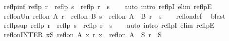 \begin{isabellebody}
%
\endisadelimproof
\isanewline
{}\isamarkupfalse%
\ reflp{\isacharunderscore}{\kern0pt}inf{\isacharcolon}{\kern0pt}\ {\isachardoublequoteopen}reflp\ r\ {\isasymLongrightarrow}\ reflp\ s\ {\isasymLongrightarrow}\ reflp\ {\isacharparenleft}{\kern0pt}r\ {\isasymsqinter}\ s{\isacharparenright}{\kern0pt}{\isachardoublequoteclose}\isanewline
%
\isadelimproof
\ \ %
\endisadelimproof
%
\isatagproof
{}\isamarkupfalse%
\ {\isacharparenleft}{\kern0pt}auto\ intro{\isacharcolon}{\kern0pt}\ reflpI\ elim{\isacharcolon}{\kern0pt}\ reflpE{\isacharparenright}{\kern0pt}%
\endisatagproof
{\isafoldproof}%
%
\isadelimproof
\isanewline
%
\endisadelimproof
\isanewline
{}\isamarkupfalse%
\ refl{\isacharunderscore}{\kern0pt}on{\isacharunderscore}{\kern0pt}Un{\isacharcolon}{\kern0pt}\ {\isachardoublequoteopen}refl{\isacharunderscore}{\kern0pt}on\ A\ r\ {\isasymLongrightarrow}\ refl{\isacharunderscore}{\kern0pt}on\ B\ s\ {\isasymLongrightarrow}\ refl{\isacharunderscore}{\kern0pt}on\ {\isacharparenleft}{\kern0pt}A\ {\isasymunion}\ B{\isacharparenright}{\kern0pt}\ {\isacharparenleft}{\kern0pt}r\ {\isasymunion}\ s{\isacharparenright}{\kern0pt}{\isachardoublequoteclose}\isanewline
%
\isadelimproof
\ \ %
\endisadelimproof
%
\isatagproof
{}\isamarkupfalse%
\ refl{\isacharunderscore}{\kern0pt}on{\isacharunderscore}{\kern0pt}def\ \isamarkupfalse%
\ blast%
\endisatagproof
{\isafoldproof}%
%
\isadelimproof
\isanewline
%
\endisadelimproof
\isanewline
{}\isamarkupfalse%
\ reflp{\isacharunderscore}{\kern0pt}sup{\isacharcolon}{\kern0pt}\ {\isachardoublequoteopen}reflp\ r\ {\isasymLongrightarrow}\ reflp\ s\ {\isasymLongrightarrow}\ reflp\ {\isacharparenleft}{\kern0pt}r\ {\isasymsqunion}\ s{\isacharparenright}{\kern0pt}{\isachardoublequoteclose}\isanewline
%
\isadelimproof
\ \ %
\endisadelimproof
%
\isatagproof
{}\isamarkupfalse%
\ {\isacharparenleft}{\kern0pt}auto\ intro{\isacharcolon}{\kern0pt}\ reflpI\ elim{\isacharcolon}{\kern0pt}\ reflpE{\isacharparenright}{\kern0pt}%
\endisatagproof
{\isafoldproof}%
%
\isadelimproof
\isanewline
%
\endisadelimproof
\isanewline
{}\isamarkupfalse%
\ refl{\isacharunderscore}{\kern0pt}on{\isacharunderscore}{\kern0pt}INTER{\isacharcolon}{\kern0pt}\ {\isachardoublequoteopen}{\isasymforall}x{\isasymin}S{\isachardot}{\kern0pt}\ refl{\isacharunderscore}{\kern0pt}on\ {\isacharparenleft}{\kern0pt}A\ x{\isacharparenright}{\kern0pt}\ {\isacharparenleft}{\kern0pt}r\ x{\isacharparenright}{\kern0pt}\ {\isasymLongrightarrow}\ refl{\isacharunderscore}{\kern0pt}on\ {\isacharparenleft}{\kern0pt}{\isasymInter}{\isacharparenleft}{\kern0pt}A\ {\isacharbackquote}{\kern0pt}\ S{\isacharparenright}{\kern0pt}{\isacharparenright}{\kern0pt}\ {\isacharparenleft}{\kern0pt}{\isasymInter}{\isacharparenleft}{\kern0pt}r\ {\isacharbackquote}{\kern0pt}\ S{\isacharparenright}{\kern0pt}{\isacharparenright}{\kern0pt}{\isachardoublequoteclose}\isanewline

\end{isabellebody}
